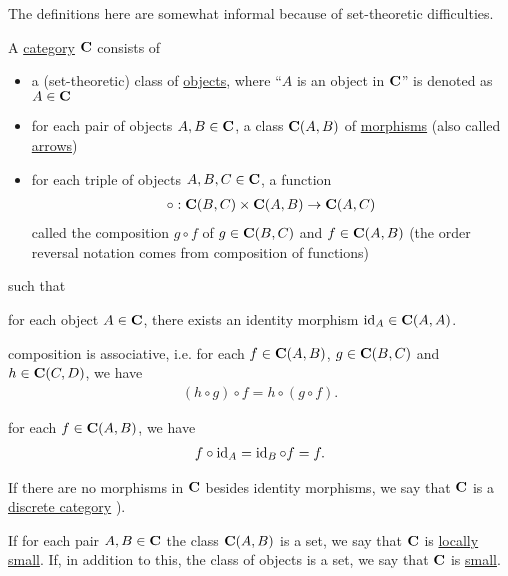 \begin{note}
  The definitions here are somewhat informal because of set-theoretic difficulties.
\end{note}

\begin{definition}\label{def:category}\cite[definition 1.1.1]{Leinster2014}
  A \uline{category} $\operatorname{\mathbf{C}}$ consists of
  \begin{itemize}
    \item a (set-theoretic) class of \uline{objects}, where \enquote{$A$ is an object in $\operatorname{\mathbf{C}}$} is denoted as $A \in \operatorname{\mathbf{C}}$
    \item for each pair of objects $A, B \in \operatorname{\mathbf{C}}$, a class ${\operatorname{\mathbf{C}}}(A, B)$ of \uline{morphisms} (also called \uline{arrows})
    \item for each triple of objects $A, B, C \in \operatorname{\mathbf{C}}$, a function
    \begin{align*}
      \circ: {\operatorname{\mathbf{C}}}(B, C) \times {\operatorname{\mathbf{C}}}(A, B) \to {\operatorname{\mathbf{C}}}(A, C)
    \end{align*}
    called the composition $g \circ f$ of $g \in {\operatorname{\mathbf{C}}}(B, C)$ and $f \in {\operatorname{\mathbf{C}}}(A, B)$ (the order reversal notation comes from composition of functions)
  \end{itemize}
  such that
  \begin{defenum}
    \item for each object $A \in \operatorname{\mathbf{C}}$, there exists an identity morphism $\operatorname{id}_A \in {\operatorname{\mathbf{C}}}(A, A)$.
    \item composition is associative, i.e. for each $f \in {\operatorname{\mathbf{C}}}(A, B)$, $g \in {\operatorname{\mathbf{C}}}(B, C)$ and $h \in {\operatorname{\mathbf{C}}}(C, D)$, we have
    \begin{align*}
      (h \circ g) \circ f = h \circ (g \circ f).
    \end{align*}
    \item for each $f \in {\operatorname{\mathbf{C}}}(A, B)$, we have
    \begin{align*}
      f \circ \operatorname{id}_A = \operatorname{id}_B \circ f = f.
    \end{align*}
  \end{defenum}

  If there are no morphisms in $\operatorname{\mathbf{C}}$ besides identity morphisms, we say that $\operatorname{\mathbf{C}}$ is a \uline{discrete category} \cite[example 1.1.18(b]{Leinster2014}).

  If for each pair $A, B \in \operatorname{\mathbf{C}}$ the class $\operatorname{\mathbf{C}}(A, B)$ is a set, we say that $\operatorname{\mathbf{C}}$ is \uline{locally small}. If, in addition to this, the class of objects is a set, we say that $\operatorname{\mathbf{C}}$ is \uline{small}.
\end{definition}

